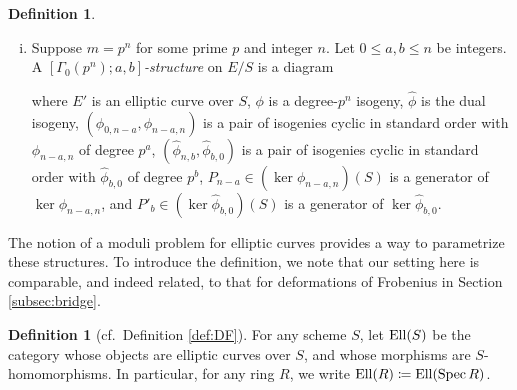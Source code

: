 \documentclass{gtpart}
\theoremstyle{definition}
\newtheorem{defn}[thm]{Definition}
\theoremstyle{remark}
\newcommand{\Spec}{{\rm Spec\thinspace}}
\newcommand{\Ell}{{\rm Ell}}
\newcommand{\Hphi}{\widehat{\phi}}
\newcommand{\G}{\Gamma}
\newcommand{\ce}{\coloneqq}
\numberwithin{equation}{section}
\numberwithin{thm}{section}
\begin{document}
\begin{defn}
\begin{enumerate}[(i)]
  \item Suppose $m = p^n$ for some prime $p$ and integer $n$.  Let 
  $0 \leq a,b \leq n$ be integers.  A {\em $[\G_0(p^n);a,b]$-structure} 
  on $E/S$ is a diagram 
  \begin{center}
  \end{center}
  where $E'$ is an elliptic curve over $S$, $\phi$ is a degree-$p^n$ 
  isogeny, $\Hphi$ is the dual isogeny, $(\phi_{0,n-a},\phi_{n-a,n})$ is 
  a pair of isogenies cyclic in standard order with $\phi_{n-a,n}$ of 
  degree $p^a$, $(\Hphi_{n,b},\Hphi_{b,0})$ is a pair of isogenies 
  cyclic in standard order with $\Hphi_{b,0}$ of degree $p^b$, 
  $P_{n-a} \in (\ker \phi_{n-a,n})(S)$ is a generator of 
  $\ker \phi_{n-a,n}$, and $P'_b \in (\ker \Hphi_{b,0})(S)$ is a 
  generator of $\ker \Hphi_{b,0}$.  
 \end{enumerate}
\end{defn}

The notion of a moduli problem for elliptic curves provides a way to 
parametrize these structures.  To introduce the definition, we note that 
our setting here is comparable, and indeed related, to that for 
deformations of Frobenius in Section \ref{subsec:bridge}.  

\begin{defn}[cf.~Definition \ref{def:DF}]
 For any scheme $S$, let $\Ell(S)$ be the category whose objects are 
 elliptic curves over $S$, and whose morphisms are $S$-homomorphisms.  
 In particular, for any ring $R$, we write $\Ell(R) \ce \Ell(\Spec R)$.  
\end{defn}
\end{document}
